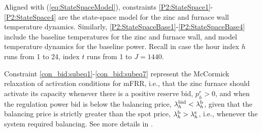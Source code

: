 \documentclass[conference]{IEEEtran}
\begin{document}
Aligned with (\ref{eq:StateSpaceModel}), constraints \eqref{P2:StateSpace1}-\eqref{P2:StateSpace4} are the state-space model for the zinc and furnace wall temperature dynamics. Similarly, \eqref{P2:StateSpaceBase1}-\eqref{P2:StateSpaceBase4} include the baseline temperatures for the zinc and furnace wall, and model temperature dynamics for the baseline power. %
Recall in case the hour index $h$ runs from 1 to 24, index $t$ runs from 1 to $J=1440$.

Constraint \eqref{con_bid:subeq1}-\eqref{con_bid:subeq7} represent the McCormick relaxation of activation conditions for mFRR, i.e., that the zinc furnace should activate its capacity whenever there is a positive reserve bid, $p^{r}_{h} > 0$, and when the regulation power bid is below the balancing price, $\lambda_{h}^{\rm{bid}} < \lambda_{h}^{\rm{b}}$, given that the balancing price is strictly greater than the spot price, $\lambda_{h}^{\rm{b}} > \lambda_{h}^{\rm{s}}$, i.e., whenever the system required balancing. See more details in \cite{gade2023load}.
\end{document}
